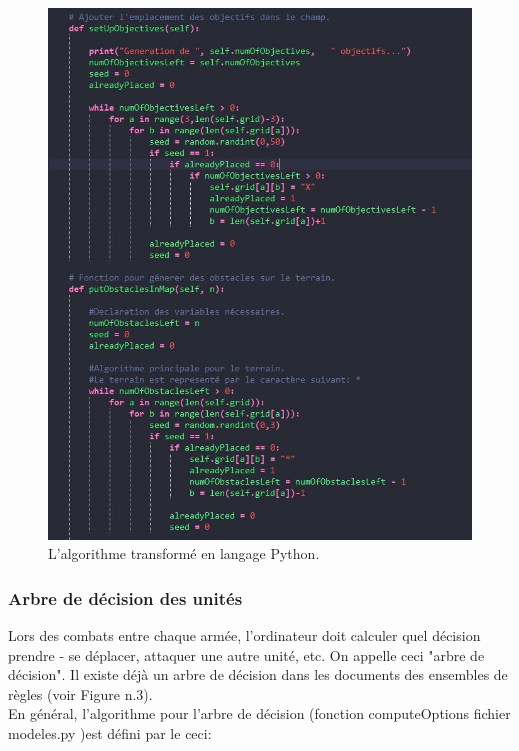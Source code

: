 \documentclass[a4paper, 11pt]{article}
\begin{document}
\begin{figure}[!htbp]

\includegraphics[scale=0.6]{Python-Terrain}

\caption{L'algorithme transformé en langage Python.}

\end{figure}

\subsubsection{Arbre de décision des unités}

Lors des combats entre chaque armée, l'ordinateur doit calculer quel décision prendre - se déplacer, attaquer une autre unité, etc. On appelle ceci "arbre de décision".
Il existe déjà un arbre de décision dans les documents des ensembles de règles (voir Figure n.3). \\

En général, l'algorithme pour l'arbre de décision (fonction computeOptions fichier modeles.py )est défini par le ceci:
\end{document}
